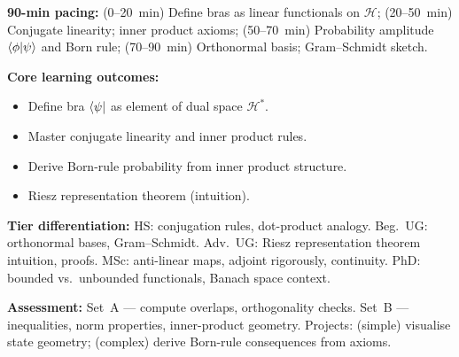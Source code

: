\documentclass[11pt,a4paper]{article}
\begin{document}
\medskip
\begin{tcolorbox}[modulebox, title={Module~I.2 / L02: Bras, Dual Space \& Inner Product Structure}]
\textbf{90-min pacing:} (0--20~min) Define bras as linear functionals on $\mathcal{H}$;
(20--50~min) Conjugate linearity; inner product axioms;
(50--70~min) Probability amplitude $\braket{\phi|\psi}$ and Born rule;
(70--90~min) Orthonormal basis; Gram--Schmidt sketch.

\medskip\textbf{Core learning outcomes:}
\begin{itemize}[leftmargin=1.4em,topsep=2pt,itemsep=1pt]
  \item Define bra $\bra{\psi}$ as element of dual space $\mathcal{H}^*$.
  \item Master conjugate linearity and inner product rules.
  \item Derive Born-rule probability from inner product structure.
  \item Riesz representation theorem (intuition).
\end{itemize}

\medskip\textbf{Tier differentiation:}
HS: conjugation rules, dot-product analogy.
Beg.\ UG: orthonormal bases, Gram--Schmidt.
Adv.\ UG: Riesz representation theorem intuition, proofs.
MSc: anti-linear maps, adjoint rigorously, continuity.
PhD: bounded vs.\ unbounded functionals, Banach space context.

\medskip\textbf{Assessment:}
Set~A --- compute overlaps, orthogonality checks.
Set~B --- inequalities, norm properties, inner-product geometry.
Projects: (simple) visualise state geometry; (complex) derive Born-rule consequences from axioms.
\end{tcolorbox}
\end{document}
